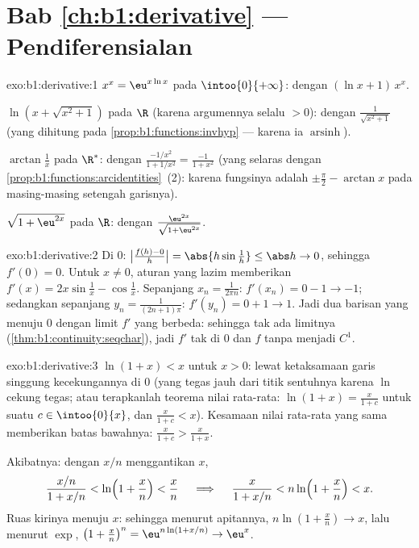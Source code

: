 \section*{Bab \ref{ch:b1:derivative} --- Pendiferensialan}

\begin{solution}{exo:b1:derivative:1}
$x^x = \eu^{x\ln x}$ pada $\intoo{0}{+\infty}$: dengan  $(\ln x +
1)\,x^x$.

$\ln(x + \sqrt{x^2+1})$ pada $\R$ (karena argumennya selalu $> 0$):
dengan  $\frac{1}{\sqrt{x^2+1}}$ (yang dihitung pada
\cref{prop:b1:functions:invhyp} --- karena ia
$\operatorname{arsinh}$).

$\arctan\frac1x$ pada $\R^*$: dengan  $\frac{-1/x^2}{1 + 1/x^2} =
\frac{-1}{1 + x^2}$ (yang selaras dengan
\cref{prop:b1:functions:arcidentities}~(2): karena fungsinya adalah
$\pm\frac\pi2 - \arctan x$ pada masing-masing setengah garisnya).

$\sqrt{1 + \eu^{2x}}$ pada $\R$: dengan 
$\frac{\eu^{2x}}{\sqrt{1 + \eu^{2x}}}$.
\end{solution}

\begin{solution}{exo:b1:derivative:2}
Di $0$: $\bigl|\frac{f(h) - 0}{h}\bigr| = \abs{h \sin\frac1h} \leq
\abs h \to 0$, sehingga $f'(0) = 0$. Untuk $x \neq 0$, aturan yang lazim memberikan
$f'(x) = 2x\sin\frac1x - \cos\frac1x$. Sepanjang $x_n = \frac{1}{2\pi
n}$: $f'(x_n) = 0 - 1 \to -1$; sedangkan sepanjang $y_n = \frac{1}{(2n+1)\pi}$:
$f'(y_n) = 0 + 1 \to 1$. Jadi dua barisan yang menuju $0$ dengan limit
$f'$ yang berbeda: sehingga tak ada limitnya (\cref{thm:b1:continuity:seqchar}), jadi $f'$
tak  di $0$ dan $f$  tanpa menjadi
$C^1$.
\end{solution}

\begin{solution}{exo:b1:derivative:3}
$\ln(1+x) < x$ untuk $x > 0$: lewat ketaksamaan garis singgung kecekungannya di $0$
(yang tegas jauh dari titik sentuhnya karena $\ln$ cekung tegas;
atau terapkanlah teorema nilai rata-rata: $\ln(1+x) = \frac{x}{1+c}$ untuk suatu
$c \in \intoo{0}{x}$, dan $\frac{x}{1+c} < x$). Kesamaan nilai rata-rata
yang sama memberikan batas bawahnya: $\frac{x}{1+c} > \frac{x}{1+x}$.

Akibatnya: dengan $x/n$ menggantikan $x$,
\[
\frac{x/n}{1 + x/n} < \ln\Bigl(1 + \frac xn\Bigr) < \frac xn
\quad\implies\quad
\frac{x}{1 + x/n} < n \ln\Bigl(1 + \frac xn\Bigr) < x .
\]
Ruas kirinya menuju $x$: sehingga menurut apitannya, $n\ln(1 + \frac xn)
\to x$, lalu menurut  $\exp$, $\bigl(1 + \frac xn\bigr)^n =
\eu^{n\ln(1 + x/n)} \to \eu^x$.
\end{solution}

